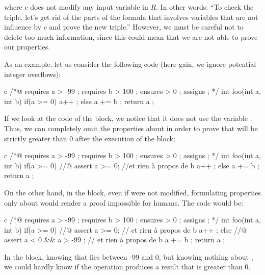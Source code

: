 \documentclass[middle]{zmdocument}
\begin{document}
where $c$ does not modify any input variable in $R$. In other words:
``To check the triple, let's get rid of the parts of the formula that
involves variables that are not influence by $c$ and prove the new
triple.'' However, we must be careful not to delete too much
information, since this could mean that we are not able to prove our
properties.


As an example, let us consider the following code (here gain, we ignore
potential integer overflows):



\begin{CodeBlock}{c}
/*@
  requires a > -99 ;
  requires b > 100 ;
  ensures  \result > 0 ;
  assigns  \nothing ;
*/
int foo(int a, int b){
  if(a >= 0){
    a++ ;
  } else {
    a += b ;
  }
  return a ;
}
\end{CodeBlock}


If we look at the code of the  block, we notice that it does
not use the variable . Thus, we can completely omit the
properties about  in order to prove that  will be
strictly greater than 0 after the execution of the block:



\begin{CodeBlock}{c}
/*@
  requires a > -99 ;
  requires b > 100 ;
  ensures  \result > 0 ;
  assigns  \nothing ;
*/
int foo(int a, int b){
  if(a >= 0){
    //@ assert a >= 0; //et rien à propos de b
    a++ ;
  } else {
    a += b ;
  }
  return a ;
}
\end{CodeBlock}



On the other hand, in the  block, even if  were
not modified, formulating properties only about  would render
a proof impossible for humans. The code would be:



\begin{CodeBlock}{c}
/*@
  requires a > -99 ;
  requires b > 100 ;
  ensures  \result > 0 ;
  assigns  \nothing ;
*/
int foo(int a, int b){
  if(a >= 0){
    //@ assert a >= 0; // et rien à propos de b
    a++ ;
  } else {
    //@ assert a < 0 && a > -99 ; // et rien à propos de b
    a += b ;
  }
  return a ;
}
\end{CodeBlock}



In the  block, knowing that lies between -99 and
0, but knowing nothing about , we could hardly know if the
operation  produces a result that is greater than 0.
\end{document}
